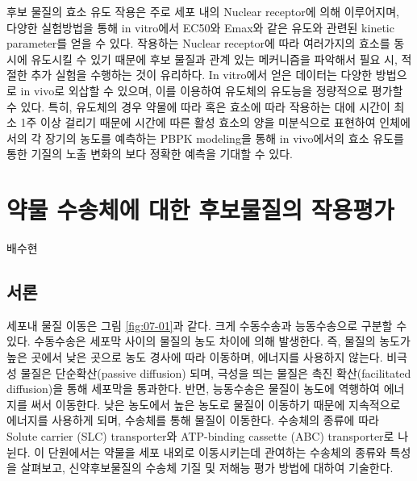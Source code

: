 \documentclass[
  11pt,
  krantz2, a4paper, twoside]{krantz}
\begin{document}
후보 물질의 효소 유도 작용은 주로 세포 내의 Nuclear receptor에 의해
이루어지며, 다양한 실험방법을 통해 in vitro에서 EC50와 Emax와 같은
유도와 관련된 kinetic parameter를 얻을 수 있다. 작용하는 Nuclear
receptor에 따라 여러가지의 효소를 동시에 유도시킬 수 있기 때문에 후보
물질과 관계 있는 메커니즘을 파악해서 필요 시, 적절한 추가 실험을
수행하는 것이 유리하다. In vitro에서 얻은 데이터는 다양한 방법으로 in
vivo로 외삽할 수 있으며, 이를 이용하여 유도체의 유도능을 정량적으로
평가할 수 있다. 특히, 유도체의 경우 약물에 따라 혹은 효소에 따라
작용하는 대에 시간이 최소 1주 이상 걸리기 때문에 시간에 따른 활성 효소의
양을 미분식으로 표현하여 인체에서의 각 장기의 농도를 예측하는 PBPK
modeling을 통해 in vivo에서의 효소 유도를 통한 기질의 노출 변화의 보다
정확한 예측을 기대할 수 있다.

\chapter{약물 수송체에 대한 후보물질의 작용평가}\label{uxc57duxbb3c-uxc218uxc1a1uxccb4uxc5d0-uxb300uxd55c-uxd6c4uxbcf4uxbb3cuxc9c8uxc758-uxc791uxc6a9uxd3c9uxac00}

\Large\hfill

배수현 \normalsize

\section{서론}\label{uxc11cuxb860-6}

세포내 물질 이동은 그림 \ref{fig:07-01}과 같다. 크게 수동수송과
능동수송으로 구분할 수 있다. 수동수송은 세포막 사이의 물질의 농도 차이에
의해 발생한다. 즉, 물질의 농도가 높은 곳에서 낮은 곳으로 농도 경사에
따라 이동하며, 에너지를 사용하지 않는다. 비극성 물질은 단순확산(passive
diffusion) 되며, 극성을 띄는 물질은 촉진 확산(facilitated diffusion)을
통해 세포막을 통과한다. 반면, 능동수송은 물질이 농도에 역행하여 에너지를
써서 이동한다. 낮은 농도에서 높은 농도로 물질이 이동하기 때문에
지속적으로 에너지를 사용하게 되며, 수송체를 통해 물질이 이동한다.
수송체의 종류에 따라 Solute carrier (SLC) transporter와 ATP-binding
cassette (ABC) transporter로 나뉜다. 이 단원에서는 약물을 세포 내외로
이동시키는데 관여하는 수송체의 종류와 특성을 살펴보고, 신약후보물질의
수송체 기질 및 저해능 평가 방법에 대하여 기술한다.
\end{document}
